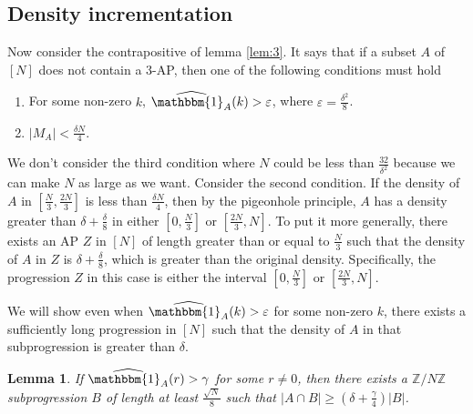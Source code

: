 \documentclass[12pt, titlepage]{article}
\newtheorem{lem}[thm]{Lemma}
\theoremstyle{definition}
\newcommand{\vep}{\varepsilon}
\newcommand{\znz}{\mathbb{Z}/N\mathbb{Z}}
\newcommand{\indi}{\mathbbm{1}}
\begin{document}
\subsection{Density incrementation}
Now consider the contrapositive of lemma \ref{lem:3}. It says that if a subset $A$ of $[N]$ does not contain a $3$-AP, then one of the following conditions must hold
\begin{enumerate}
    \item For some non-zero $k$, $\widehat{\indi_A}(k) > \vep$, where $\vep = \frac{\delta^2}{8}$.
    \item $|M_A| < \frac{\delta N}{4}$.
\end{enumerate}
We don't consider the third condition where $N$ could be less than $\frac{32}{\delta^2}$ because we can make $N$ as large as we want. Consider the second condition. If the density of $A$ in $\left[ \frac{N}{3}, \frac{2N}{3} \right]$ is less than $\frac{\delta N}{4}$, then by the pigeonhole principle, $A$ has a density greater than $\delta + \frac{\delta}{8}$ in either $\left[ 0, \frac{N}{3} \right]$ or $\left[ \frac{2N}{3}, N \right]$. To put it more generally, there exists an AP $Z$ in $[N]$ of length greater than or equal to $\frac{N}{3}$ such that the density of $A$ in $Z$ is $\delta + \frac{\delta}{8}$, which is greater than the original density. Specifically, the progression $Z$ in this case is either the interval $\left[ 0, \frac{N}{3} \right]$ or $\left[ \frac{2N}{3}, N \right]$.

We will show even when $\widehat{\indi_A}(k) > \vep$ for some non-zero $k$, there exists a sufficiently long progression in $[N]$ such that the density of $A$ in that subprogression is greater than $\delta$.

\begin{lem} \label{dens:1}
    If $\widehat{\indi_A}(r) > \gamma$ for some $r \neq 0$, then there exists a $\znz$ subprogression $B$ of length at least $\frac{\sqrt{N}}{8}$ such that $|A \cap B| \geq \left( \delta + \frac{\gamma}{4} \right)|B| $.
\end{lem}
\end{document}
